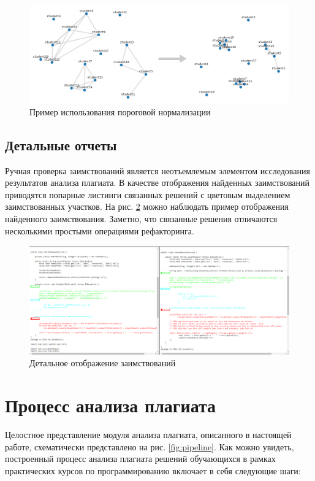 \documentclass[a4paper,14pt]{extarticle}
\begin{document}
\begin{figure}[h!]
\centering
\includegraphics[width=1.0\textwidth]{graph_normalization.png}
\caption{Пример использования пороговой нормализации}
\label{fig:graph_normalization}
\end{figure}

\subsection{Детальные отчеты}

Ручная проверка заимствований является неотъемлемым элементом исследования результатов анализа плагиата. В качестве отображения найденных заимствований приводятся попарные листинги связанных решений с цветовым выделением заимствованных участков. На рис. \ref{fig:diff} можно наблюдать пример отображения найденного заимствования. Заметно, что связанные решения отличаются несколькими простыми операциями рефакторинга.

\begin{figure}[h!]
\centering
\includegraphics[width=1.0\textwidth]{plagiarism_match.png}
\caption{Детальное отображение заимствований}
\label{fig:diff}
\end{figure}

\section{Процесс анализа плагиата}

Целостное представление модуля анализа плагиата, описанного в настоящей работе, схематически представлено на рис. \ref{fig:pipeline}. Как можно увидеть, построенный процесс анализа плагиата решений обучающихся в рамках практических курсов по программированию включает в себя следующие шаги:
\end{document}
